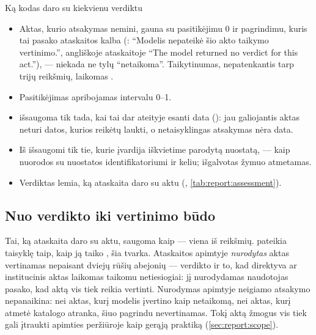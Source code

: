 \begin{codebox}{Ką kodas daro su kiekvienu verdiktu}
\begin{itemize}
  \item Aktas, kurio atsakymas nemini, gauna  su pasitikėjimu 0 ir pagrindimu,
    kuris tai pasako ataskaitos kalba (: \enquote{Modelis nepateikė šio akto
    taikymo vertinimo.}, angliškoje ataskaitoje \enquote{The model returned no verdict for
    this act.}), --- niekada ne tylų \enquote{netaikoma}.
    Taikytinumas, nepatenkantis tarp trijų reikšmių, laikomas .
  \item Pasitikėjimas apribojamas intervalu 0--1.
  \item {} išsaugoma tik tada, kai tai dar ateityje esanti data
    (): jau galiojantis aktas neturi datos, kurios reikėtų laukti, o
    netaisyklingas atsakymas nėra data.
  \item Iš  išsaugomi tik tie, kurie įvardija iškvietime parodytą nuostatą,
    --- kaip nuorodos su nuostatos identifikatoriumi ir keliu; išgalvotas žymuo atmetamas.
  \item Verdiktas lemia, ką ataskaita daro su aktu (,
    \cref{tab:report:assessment}).
\end{itemize}
\end{codebox}

\subsection{Nuo verdikto iki vertinimo būdo}\label{sec:report:assessment}

Tai, ką ataskaita daro su aktu, saugoma kaip  --- viena iš
 reikšmių.  pateikia taisyklę taip, kaip ją taiko
, šia tvarka. Ataskaitos apimtyje \emph{nurodytas} aktas vertinamas
nepaisant dviejų rūšių abejonių --- verdikto  ir to, kad direktyva ar
institucinis aktas laikomas taikomu netiesiogiai: jį nurodydamas naudotojas pasako, kad aktą
vis tiek reikia vertinti. Nurodymas apimtyje neigiamo atsakymo nepanaikina: nei
aktas, kurį modelis įvertino kaip netaikomą, nei aktas, kurį atmetė katalogo atranka, šiuo
pagrindu nevertinamas. Tokį aktą žmogus vis tiek gali įtraukti apimties peržiūroje kaip gerąją
praktiką (\cref{sec:report:scope}).

